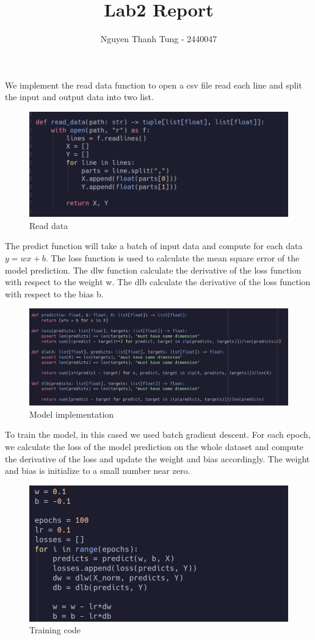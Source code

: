 \documentclass{article}
\title{Lab2 Report}
\author{Nguyen Thanh Tung - 2440047}
\begin{document}
\maketitle

We implement the read data function to open a csv file read each line and split the input and output data into two list.


\begin{figure}[H]
    \centering
    \includegraphics[width=0.5\linewidth]{read_data.png}
    \caption{Read data}
    \label{fig:enter-label}
\end{figure}

The predict function will take a batch of input data and compute for each data \(y=wx+b\). The loss function is used to calculate the mean square error of the model prediction. The dlw function calculate the derivative of the loss function with respect to the weight w. The dlb calculate the derivative of the loss function with respect to the bias b. 

\begin{figure}[H]
    \centering
    \includegraphics[width=0.5\linewidth]{impl.png}
    \caption{Model implementation}
    \label{fig:enter-label}
\end{figure}

To train the model, in this cased we used batch gradient descent. For each epoch, we calculate the loss of the model prediction on the whole dataset and compute the derivative of the loss and update the weight and bias accordingly. The weight and bias is initialize to a small number near zero.

\begin{figure}[H]
    \centering
    \includegraphics[width=0.5\linewidth]{train.png}
    \caption{Training code}
    \label{fig:enter-label}
\end{figure}
\end{document}
